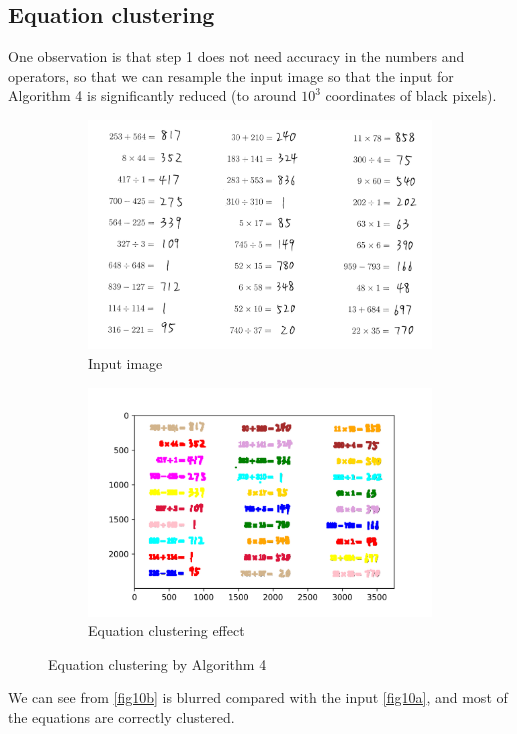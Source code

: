 \subsection{Equation clustering}
One observation is that step 1 does not need accuracy in the numbers and operators, so that we can resample the input image so that the input for Algorithm 4 is significantly reduced (to around \(10^3\) coordinates of black pixels).
\begin{figure}[htbp]
    \vspace{-1em}
    \centering
    \begin{subfigure}[t]{0.45\textwidth}
        \includegraphics[width=\textwidth]{../TestSamplePictures/test1.png}
        \caption{Input image}\label{fig10a}		
    \end{subfigure}
    \begin{subfigure}[t]{0.54\textwidth}
        \includegraphics[width=\textwidth]{../TestSamplePictures/test1_result.png}
        \caption{Equation clustering effect}\label{fig10b}
    \end{subfigure}
    \caption{Equation clustering by Algorithm 4}\label{fig10}
\end{figure}
We can see from \autoref{fig10b} is blurred compared with the input \autoref{fig10a}, and most of the equations are correctly clustered.

